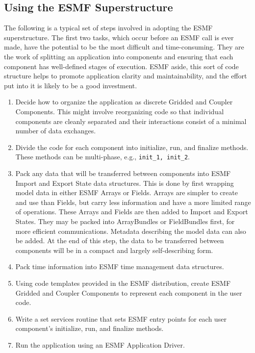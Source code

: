 \subsection{Using the ESMF Superstructure}

The following is a typical set of steps involved in adopting
the ESMF superstructure.  The first two tasks, which occur 
before an ESMF call is ever made, have the potential to be 
the most difficult and time-consuming.  They are the work 
of splitting an application into components and ensuring that
each component has well-defined stages of execution.  ESMF
aside, this sort of code structure helps to promote application
clarity and maintainability, and the effort put into it is likely
to be a good investment.

\begin{enumerate}

\item Decide how to organize the application as discrete Gridded 
and Coupler Components.  This might involve reorganizing code
so that individual components are cleanly separated and their 
interactions consist of a minimal number of data exchanges.

\item Divide the code for each component into initialize, run, and
finalize methods.  These methods can be multi-phase, e.g., 
{\tt init\_1, init\_2}.

\item Pack any data that will be transferred between components
into ESMF Import and Export State data structures.  This is done
by first wrapping model data in either ESMF Arrays or Fields.
Arrays are simpler to create and use than Fields, but carry less
information and have a more limited range of operations.
These Arrays and Fields are then added to Import and
Export States.  They may be packed into ArrayBundles or
FieldBundles first, for more efficient communications.
Metadata describing the model data can also be added.
At the end of this step, the data to be transferred between
components will be in a compact and largely self-describing
form.

\item Pack time information into ESMF time management data 
structures.

\item Using code templates provided in the ESMF distribution, create
ESMF Gridded and Coupler Components to represent each component
in the user code.

\item Write a set services routine that sets ESMF entry 
points for each user component's initialize, run, and finalize 
methods.

\item Run the application using an ESMF Application Driver.

\end{enumerate} 











